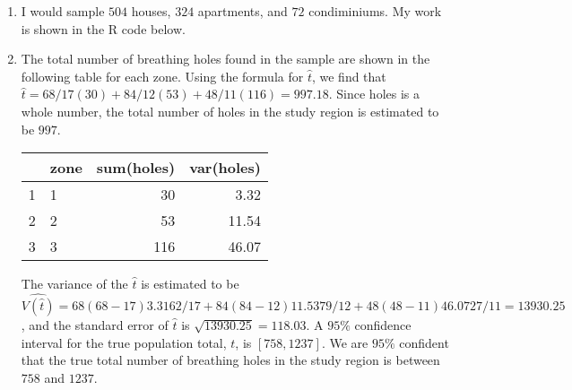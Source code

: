 \documentclass[12pt]{article}\usepackage[]{graphicx}\usepackage[]{color}
\makeatletter
\newcommand{\hlnum}[1]{\textcolor[rgb]{0.686,0.059,0.569}{#1}}%
\newcommand{\hlcom}[1]{\textcolor[rgb]{0.678,0.584,0.686}{\textit{#1}}}%
\newcommand{\hlopt}[1]{\textcolor[rgb]{0,0,0}{#1}}%
\newenvironment{kframe}{%
 \def\at@end@of@kframe{}%
 \ifinner\ifhmode%
  \def\at@end@of@kframe{\end{minipage}}%
  \begin{minipage}{\columnwidth}%
 \fi\fi%
 \def\FrameCommand##1{\hskip\@totalleftmargin \hskip-\fboxsep
 \colorbox{shadecolor}{##1}\hskip-\fboxsep
     \hskip-\linewidth \hskip-\@totalleftmargin \hskip\columnwidth}%
 \MakeFramed {\advance\hsize-\width
   \@totalleftmargin\z@ \linewidth\hsize
   \@setminipage}}%
 {\par\unskip\endMakeFramed%
 \at@end@of@kframe}
\newenvironment{knitrout}{}{} %
\makeatother
\begin{document}
\begin{doublespacing}
\begin{enumerate}
\begin{enumerate}
\item The expected value of $\hat{t}$ is $E[\hat{t}] = 38.67(1/16)+45.33(1/16)+41.33(1/16)+46.67(1/4)+40(1/8)+42.67(1/8)+48(1/8)+44(1/16)+50.67(1/16)+52(1/16) = 45$. The true population total is $45$, so $\hat{t}$ is unbiased. 

\end{enumerate}

\item I would sample $504$ houses, $324$ apartments, and $72$ condiminiums. My work is shown in the R code below.



\item The total number of breathing holes found in the sample are shown in the following table for each zone. Using the formula for $\hat{t}$, we find that $\hat{t} = 68/17(30)+84/12(53)+48/11(116) = 997.18$. Since holes is a whole number, the total number of holes in the study region is estimated to be $997$. 

\begin{table}[ht]
\centering
\begin{tabular}{rlrr}
  \hline
 & zone & sum(holes) & var(holes) \\ 
  \hline
1 & 1 &  30 & 3.32 \\ 
  2 & 2 &  53 & 11.54 \\ 
  3 & 3 & 116 & 46.07 \\ 
   \hline
\end{tabular}
\end{table}


The variance of the $\hat{t}$ is estimated to be $\widehat{V(\hat{t})} = 68(68-17)3.3162/17 + 84(84-12)11.5379/12 + 48(48-11)46.0727/11 = 13930.25$, and the standard error of $\hat{t}$ is $\sqrt{13930.25} = 118.03$. A $95\%$ confidence interval for the true population total, $t$, is $[758, 1237]$. We are $95\%$ confident that the true total number of breathing holes in the study region is between $758$ and $1237$.


\end{enumerate}
\end{doublespacing}
\end{document}
